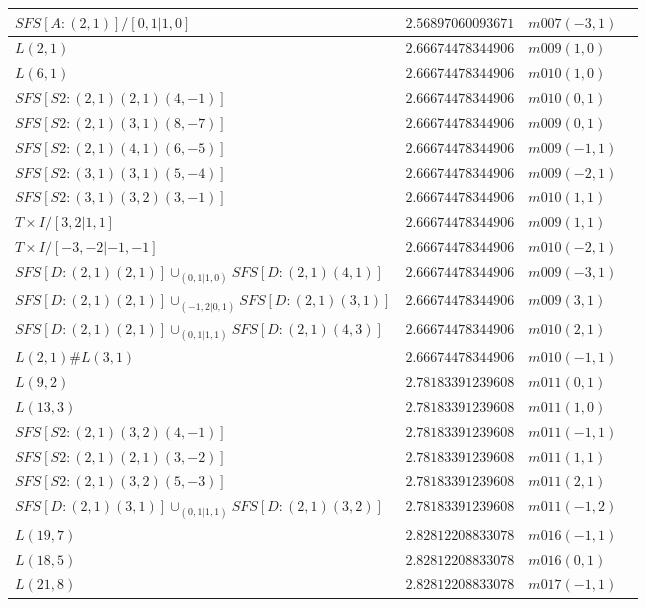 \documentclass[a4paper]{gtart}
\theoremstyle{definition}
\theoremstyle{remark}
\numberwithin{equation}{section}
\begin{document}
\begin{center}
\begin{longtable}{llll}
		$SFS [A: (2,1)] / [ 0,1 | 1,0 ]$ & $2.56897060093671$ & $m007(-3, 1)$ & \\
		\midrule
		$L(2,1)$ & $2.66674478344906$ & $m009(1, 0)$ & \\
		$L(6,1)$ & $2.66674478344906$ & $m010(1, 0)$ & \\
		$SFS [S2: (2,1) (2,1) (4,-1)]$ & $2.66674478344906$ & $m010(0, 1)$ &  \\
		$SFS [S2: (2,1) (3,1) (8,-7)]$& $2.66674478344906$ & $m009(0, 1)$ &    \\
		$SFS [S2: (2,1) (4,1) (6,-5)]$& $2.66674478344906$ & $m009(-1, 1)$ &    \\
		$SFS [S2: (3,1) (3,1) (5,-4)]$& $2.66674478344906$ & $m009(-2, 1)$ &    \\
		$SFS [S2: (3,1) (3,2) (3,-1)]$& $2.66674478344906$ & $m010(1, 1)$ &    \\
		$T \times I / [ 3,2 | 1,1 ]$ & $2.66674478344906$ & $m009(1, 1)$ & \\
		$T \times I / [ -3,-2 | -1,-1 ]$ & $2.66674478344906$ & $m010(-2, 1)$ & \\
		$SFS [D: (2,1) (2,1)] \cup_{(0,1 | 1,0)} SFS [D: (2,1) (4,1)]$ & $2.66674478344906$ & $m009(-3, 1)$ & \\
		$SFS [D: (2,1) (2,1)] \cup_{(-1,2 | 0,1)} SFS [D: (2,1) (3,1)]$ & $2.66674478344906$ & $m009(3, 1)$ & \\
		$SFS [D: (2,1) (2,1)] \cup_{(0,1 | 1,1)} SFS [D: (2,1) (4,3)]$ & $2.66674478344906$ & $m010(2, 1)$ & \\
		$L(2,1) \# L(3,1)$ & $2.66674478344906$ &  $m010(-1, 1)$&\\
				\midrule
		$L(9,2)$ & $2.78183391239608$ & $m011(0, 1)$ & \\
		$L(13,3)$ & $2.78183391239608$ & $m011(1, 0)$ & \\
		$SFS [S2: (2,1) (3,2) (4,-1)]$ & $2.78183391239608$ & $m011(-1, 1)$ &  \\
		$SFS [S2: (2,1) (2,1) (3,-2)]$ & $2.78183391239608$ & $m011(1, 1)$ &  \\
		$SFS [S2: (2,1) (3,2) (5,-3)]$ & $2.78183391239608$ & $m011(2, 1)$ &  \\
		$SFS [D: (2,1) (3,1)] \cup_{(0,1 | 1,1)} SFS [D: (2,1) (3,2)]$ & $2.78183391239608$ & $m011(-1, 2)$ & \\
		\midrule
		$L(19,7)$ & $2.82812208833078$ & $m016(-1, 1)$ & \\
		$L(18,5)$ & $2.82812208833078$ & $m016(0, 1)$ & \\
		$L(21,8)$ & $2.82812208833078$ & $m017(-1, 1)$ & \\

\end{longtable}
\end{center}
\end{document}
